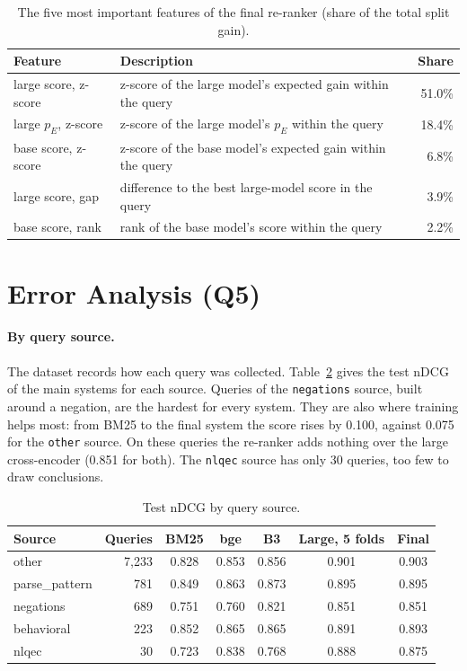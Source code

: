 \documentclass[12pt,a4paper]{report}
\begin{document}
\begin{table}[H]
\centering
\caption{The five most important features of the final re-ranker (share of the total split gain).}
\label{tab:importance}
\small
\begin{tabular}{@{}llr@{}}
\toprule
\textbf{Feature} & \textbf{Description} & \textbf{Share} \\
\midrule
large score, z-score & z-score of the large model's expected gain within the query & 51.0\% \\
large $p_E$, z-score & z-score of the large model's $p_E$ within the query & 18.4\% \\
base score, z-score & z-score of the base model's expected gain within the query & 6.8\% \\
large score, gap & difference to the best large-model score in the query & 3.9\% \\
base score, rank & rank of the base model's score within the query & 2.2\% \\
\bottomrule
\end{tabular}
\end{table}

\section{Error Analysis (Q5)}\label{sec:errors}
\paragraph{By query source.} The dataset records how each query was collected. Table~\ref{tab:source} gives the test nDCG of the main systems for each source. Queries of the \texttt{negations} source, built around a negation, are the hardest for every system. They are also where training helps most: from BM25 to the final system the score rises by 0.100, against 0.075 for the \texttt{other} source. On these queries the re-ranker adds nothing over the large cross-encoder (0.851 for both). The \texttt{nlqec} source has only 30 queries, too few to draw conclusions.

\begin{table}[H]
\centering
\caption{Test nDCG by query source.}
\label{tab:source}
\small
\begin{tabular}{@{}lrccccc@{}}
\toprule
\textbf{Source} & \textbf{Queries} & \textbf{BM25} & \textbf{bge} & \textbf{B3} & \textbf{Large, 5 folds} & \textbf{Final} \\
\midrule
other & 7,233 & 0.828 & 0.853 & 0.856 & 0.901 & 0.903 \\
parse\_pattern & 781 & 0.849 & 0.863 & 0.873 & 0.895 & 0.895 \\
negations & 689 & 0.751 & 0.760 & 0.821 & 0.851 & 0.851 \\
behavioral & 223 & 0.852 & 0.865 & 0.865 & 0.891 & 0.893 \\
nlqec & 30 & 0.723 & 0.838 & 0.768 & 0.888 & 0.875 \\
\bottomrule
\end{tabular}
\end{table}
\end{document}
